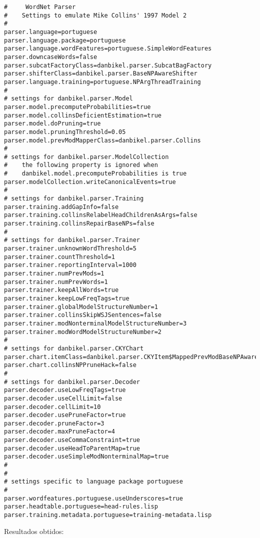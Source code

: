 \scriptsize
\begin{verbatim}
#     WordNet Parser
#    Settings to emulate Mike Collins' 1997 Model 2
#
parser.language=portuguese
parser.language.package=portuguese
parser.language.wordFeatures=portuguese.SimpleWordFeatures
parser.downcaseWords=false
parser.subcatFactoryClass=danbikel.parser.SubcatBagFactory
parser.shifterClass=danbikel.parser.BaseNPAwareShifter
parser.language.training=portuguese.NPArgThreadTraining
#
# settings for danbikel.parser.Model
parser.model.precomputeProbabilities=true
parser.model.collinsDeficientEstimation=true
parser.model.doPruning=true
parser.model.pruningThreshold=0.05
parser.model.prevModMapperClass=danbikel.parser.Collins
#
# settings for danbikel.parser.ModelCollection
#    the following property is ignored when
#    danbikel.model.precomputeProbabilities is true
parser.modelCollection.writeCanonicalEvents=true
#
# settings for danbikel.parser.Training
parser.training.addGapInfo=false
parser.training.collinsRelabelHeadChildrenAsArgs=false
parser.training.collinsRepairBaseNPs=false
#
# settings for danbikel.parser.Trainer
parser.trainer.unknownWordThreshold=5
parser.trainer.countThreshold=1
parser.trainer.reportingInterval=1000
parser.trainer.numPrevMods=1
parser.trainer.numPrevWords=1
parser.trainer.keepAllWords=true
parser.trainer.keepLowFreqTags=true
parser.trainer.globalModelStructureNumber=1
parser.trainer.collinsSkipWSJSentences=false
parser.trainer.modNonterminalModelStructureNumber=3
parser.trainer.modWordModelStructureNumber=2
#
# settings for danbikel.parser.CKYChart
parser.chart.itemClass=danbikel.parser.CKYItem$MappedPrevModBaseNPAware
parser.chart.collinsNPPruneHack=false
#
# settings for danbikel.parser.Decoder
parser.decoder.useLowFreqTags=true
parser.decoder.useCellLimit=false
parser.decoder.cellLimit=10
parser.decoder.usePruneFactor=true
parser.decoder.pruneFactor=3
parser.decoder.maxPruneFactor=4
parser.decoder.useCommaConstraint=true
parser.decoder.useHeadToParentMap=true
parser.decoder.useSimpleModNonterminalMap=true
#
#
# settings specific to language package portuguese
#
parser.wordfeatures.portuguese.useUnderscores=true
parser.headtable.portuguese=head-rules.lisp
parser.training.metadata.portuguese=training-metadata.lisp
\end{verbatim}

\normalsize

Resultados obtidos:

